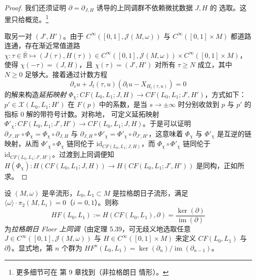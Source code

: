 \begin{proof}
我们还须证明 $\partial=\partial_{J,H}$ 诱导的上同调群不依赖微扰数据 $J,H$ 的
选取。这里只给概览。\footnote{更多细节可在 \cite{Mer14} 第 9 章找到（非拉格朗日
情形）。}

取另一对 $(J',H')$。由于 $C^\infty([0,1],\mathcal J(M,\omega))$ 与
$C^\infty([0,1]\times M)$ 都道路连通，存在渐近常值道路
$\chi:\tau\in\overline{\mathbb R}\mapsto
(J(\tau),H(\tau))\in C^\infty([0,1],\mathcal J(M,\omega))\times
C^\infty([0,1]\times M)$，使得 $\chi(-\tau)=(J,H)$，且 $\chi(\tau)=(J',H')$
对所有 $\tau\ge N$ 成立，其中 $N\ge0$ 足够大。接着通过计数方程
\[
\partial_su+J_t(\tau,u)\left(\partial_tu-X_{H_t(\tau,u)}\right)=0
\]
的解来构造\emph{延拓映射}
$\Phi_\chi:CF(L_0,L_1;J,H)\to CF(L_0,L_1;J',H')$，方式如下：
$p'\in\mathcal X(L_0,L_1;H')$ 在 $F(p)$ 中的系数，是当
$s\to\pm\infty$ 时分别收敛到 $p$ 与 $p'$ 的指标 $0$ 解的带符号计数。对称地，
可定义延拓映射
$\Phi'_\chi:CF(L_0,L_1;J',H')\to CF(L_0,L_1;J,H)$。于是可以证明
$\partial_{J',H'}\circ\Phi_\chi=\Phi_\chi\circ\partial_{J,H}$ 与
$\partial_{J,H}\circ\Phi'_\chi=\Phi'_\chi\circ\partial_{J',H'}$，这意味着
$\Phi_\chi$ 与 $\Phi'_\chi$ 是互逆的链映射，从而
$\Phi'_\chi\circ\Phi_\chi$ 链同伦于
$\mathrm{id}_{CF(L_0,L_1;J,H)}$，而 $\Phi_\chi\circ\Phi'_\chi$ 链同伦于
$\mathrm{id}_{CF(L_0,L_1;J',H')}$。过渡到上同调便知
$H(\Phi_\chi):H(CF(L_0,L_1;J,H))\to H(CF(L_0,L_1;J',H'))$ 是同构，正如所求。
\end{proof}



\begin{Def}\label{def:5.40}
设 $(M,\omega)$ 是辛流形，$L_0,L_1\subset M$ 是拉格朗日子流形，满足
$\langle\omega\rangle\cdot\pi_2(M,L_i)=0$（$i=0,1$）。则称
\begin{equation}
HF(L_0,L_1):=H(CF(L_0,L_1),\partial)=\frac{\ker(\partial)}
{\operatorname{im}(\partial)}
\label{eq:5.76}
\end{equation}
为\emph{拉格朗日 Floer 上同调}（由定理 5.39，可无歧义地选取任意
$J\in C^\infty([0,1],\mathcal J(M,\omega))$ 与 $H\in C^\infty([0,1]\times M)$
来定义 $CF(L_0,L_1)$ 与 $\partial$）。显式地，第 $n$ 个群为
$HF^n(L_0,L_1)=\ker(\partial_n)/\operatorname{im}(\partial_{n-1})$。
\end{Def}

